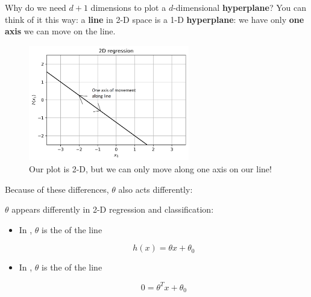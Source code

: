     Why do we need $d+1$ dimensions to plot a $d$-dimensional \textbf{hyperplane}? You can think of it this way: a \textbf{line} in 2-D space is a 1-D \textbf{hyperplane}: we have only \textbf{one axis} we can move on the line.
        
    \begin{figure}[H]
        \centering
        
        \includegraphics[width=70mm,scale=0.5]{images/classification_images/2d_regression_1d_hyperplane.png}
        \caption*{Our plot is 2-D, but we can only move along one axis on our line!}
    \end{figure}    
    
    Because of these differences, $\theta$ also acts differently:\\
    
    \begin{clarification}
        $\theta$ appears differently in 2-D regression and classification:
        
        \begin{itemize}
            \item In , $\theta$ is the  of the line
            
                \begin{equation}
                    h(x) = \theta x + \theta_0
                \end{equation}
            
            \item In , $\theta$ is the  of the line
            
                \begin{equation}
                    0 = \theta^T x + \theta_0
                \end{equation}
            
        \end{itemize}
    \end{clarification}